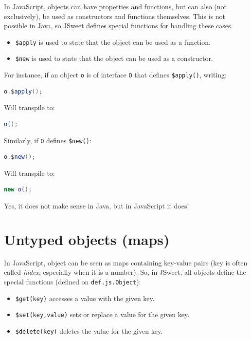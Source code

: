 \documentclass[a4paper]{report}
\begin{document}
In JavaScript, objects can have properties and functions, but can also (not exclusively), be used as constructors and functions themselves. This is not possible in Java, so JSweet defines special functions for handling these cases.

\begin{itemize}
\item \texttt{\$apply} is used to state that the object can be used as a function.
\item \texttt{\$new} is used to state that the object can be used as a constructor.
\end{itemize}

For instance, if an object \texttt{o} is of interface \texttt{O} that defines \texttt{\$apply()}, writing:

\begin{lstlisting}[language=Java]
o.$apply();
\end{lstlisting}

Will transpile to:

\begin{lstlisting}[language=Java]
o();
\end{lstlisting}

Similarly, if \texttt{O} defines \texttt{\$new()}:

\begin{lstlisting}[language=Java]
o.$new();
\end{lstlisting}

Will transpile to:

\begin{lstlisting}[language=Java]
new o();
\end{lstlisting}

Yes, it does not make sense in Java, but in JavaScript it does!

\section{Untyped objects (maps)}

In JavaScript, object can be seen as maps containing key-value pairs (key is often called \emph{index}, especially when it is a number). So, in JSweet, all objects define the special functions (defined on \texttt{def.js.Object}):

\begin{itemize}
\item \texttt{\$get(key)} accesses a value with the given key.
\item \texttt{\$set(key,value)} sets or replace a value for the given key.
\item \texttt{\$delete(key)} deletes the value for the given key.
\end{itemize}
\end{document}
